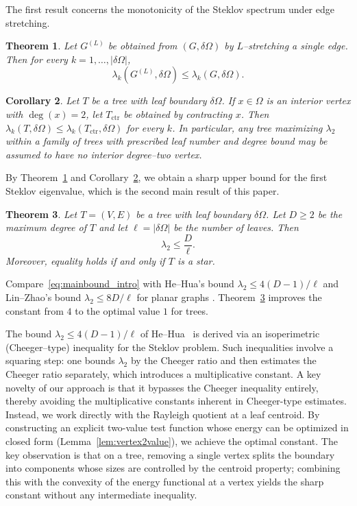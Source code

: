 \documentclass[11pt]{article}
\newtheorem{theorem}{Theorem}[section]
\newtheorem{corollary}[theorem]{Corollary}
\theoremstyle{definition}
\theoremstyle{remark}
\newcommand{\dO}{\delta\Omega}
\newcommand{\Om}{\Omega}
\begin{document}
The first result concerns the monotonicity of the Steklov spectrum under edge stretching.

\begin{theorem}\label{thm:stretch}
Let $G^{(L)}$ be obtained from $(G,\dO)$ by $L$--stretching a single edge.
Then for every $k=1,\dots,|\dO|$,
\begin{equation}\label{eq:stretch}
\lambda_k(G^{(L)},\dO)\le \lambda_k(G,\dO).
\end{equation}
\end{theorem}

\begin{corollary}\label{cor:deg2}
Let $T$ be a tree with leaf boundary $\dO$.
If $x\in\Om$ is an interior vertex with $\deg(x)=2$, let $T_{\mathrm{ctr}}$ be obtained by contracting $x$.
Then $\lambda_k(T,\dO)\le \lambda_k(T_{\mathrm{ctr}},\dO)$ for every $k$.
In particular, any tree maximizing $\lambda_2$ within a family of trees with prescribed leaf number and degree bound may be assumed to have no interior degree--two vertex.
\end{corollary}

By Theorem~\ref{thm:stretch} and Corollary~\ref{cor:deg2}, we obtain a sharp upper bound for the first Steklov eigenvalue, which is the second main result of this paper.

\begin{theorem}\label{thm:lambda2sharp}
Let $T=(V,E)$ be a tree with leaf boundary $\dO$.
Let $D\ge 2$ be the maximum degree of $T$ and let $\ell=|\dO|$ be the number of leaves.
Then
\begin{equation}\label{eq:mainbound_intro}
\lambda_2\le \frac{D}{\ell}.
\end{equation}
Moreover, equality holds if and only if $T$ is a star.
\end{theorem}

Compare~\eqref{eq:mainbound_intro} with He--Hua's bound $\lambda_2\le 4(D-1)/\ell$ \cite[Theorem~1.1]{HeHua2022Upper} and Lin--Zhao's bound $\lambda_2\le 8D/\ell$ for planar graphs \cite[Theorem~1.1]{LinZhaoPlanar}.
Theorem~\ref{thm:lambda2sharp} improves the constant from $4$ to the optimal value $1$ for trees.

The bound $\lambda_2\le 4(D-1)/\ell$ of He--Hua~\cite{HeHua2022Upper} is derived via an isoperimetric (Cheeger--type) inequality for the Steklov problem.
Such inequalities involve a squaring step: one bounds $\lambda_2$ by the Cheeger ratio and then estimates the Cheeger ratio separately, which introduces a multiplicative constant.
A key novelty of our approach is that it bypasses the Cheeger inequality entirely, thereby avoiding the multiplicative constants inherent in Cheeger-type estimates. Instead, we work directly with the Rayleigh quotient at a leaf centroid. By constructing an explicit two-value test function whose energy can be optimized in closed form (Lemma~\ref{lem:vertex2value}), we achieve the optimal constant.
The key observation is that on a tree, removing a single vertex splits the boundary into components whose sizes are controlled by the centroid property; combining this with the convexity of the energy functional at a vertex yields the sharp constant without any intermediate inequality.
\end{document}
